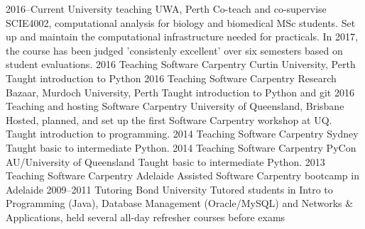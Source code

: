 \documentclass[]{friggeri-cv} %
\begin{document}
\begin{entrylist}
\entry
{2016--Current}
{University teaching}
{UWA, Perth}
{Co-teach and co-supervise SCIE4002, computational analysis for biology and biomedical MSc students. Set up and maintain the computational infrastructure needed for practicals. In 2017, the course has been judged 'consistenly excellent' over six semesters based on student evaluations.}
\entry
{2016}
{Teaching Software Carpentry}
{Curtin University, Perth}
{Taught introduction to Python}
\entry
{2016}
{Teaching Software Carpentry}
{Research Bazaar, Murdoch University, Perth}
{Taught introduction to Python and git}
\entry
{2016}
{Teaching and hosting Software Carpentry}
{University of Queensland, Brisbane}
{Hosted, planned, and set up the first Software Carpentry workshop at UQ. Taught introduction to programming.}
\entry
{2014}
{Teaching Software Carpentry}
{Sydney}
{Taught basic to intermediate Python.}
\entry
{2014}
{Teaching Software Carpentry}
{PyCon AU/University of Queensland}
{Taught basic to intermediate Python.}
\entry
{2013}
{Teaching Software Carpentry}
{Adelaide}
{Assisted Software Carpentry bootcamp in Adelaide}
\entry
{2009--2011}
{Tutoring}
{Bond University}
{Tutored students in Intro to Programming (Java), Database Management (Oracle/MySQL) and Networks \& Applications, held several all-day refresher courses before exams}
\end{entrylist}
\end{document}
